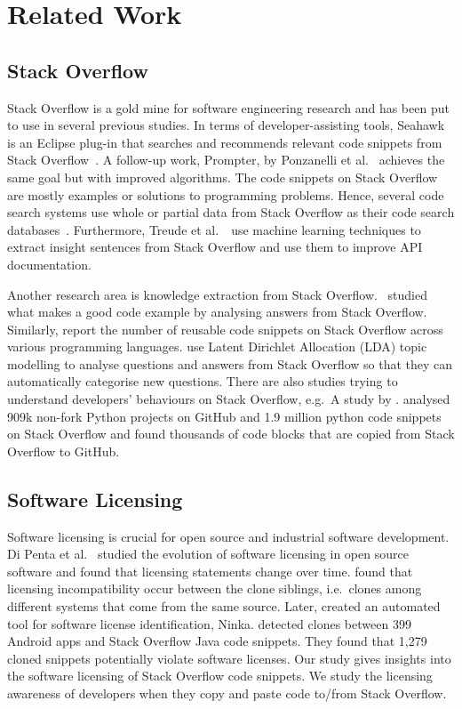 \documentclass{svjour3}                     %
\begin{document}
\section{Related Work}

\subsection{Stack Overflow}

Stack Overflow is a gold mine for software engineering research and has been put
to use in several previous studies. In terms of developer-assisting tools,
Seahawk is an Eclipse plug-in that searches and recommends relevant code
snippets from Stack Overflow~\citep{Ponzanelli2013}. A follow-up work, Prompter,
by Ponzanelli et al.~\citep{Ponzanelli2014} achieves the same goal but with
improved algorithms. The code snippets on Stack Overflow are mostly examples or
solutions to programming problems. Hence, several code search systems use whole
or partial data from Stack Overflow as their code search
databases~\citep{Keivanloo2014,Park2014,
	Stolee2014,Subramanian2013,Diamantopoulos2015}. Furthermore, Treude et
al.~\cite{Treude2016}~use machine learning techniques to extract insight
sentences from Stack Overflow and use them to improve API documentation.

Another research area is knowledge extraction from Stack Overflow.
\cite{Nasehi2012}~studied what makes a good code example by analysing answers
from Stack Overflow. Similarly, \cite{Yang2016} report the number of reusable
code snippets on Stack Overflow across various programming languages.
\cite{Wang2013_StackOverflow} use Latent Dirichlet Allocation (LDA) topic
modelling to analyse questions and answers from Stack Overflow so that they can
automatically categorise new questions. There are also studies trying to
understand developers' behaviours on Stack Overflow, e.g.~A study by
\cite{Movshovitz-Attias2013,Rosen2016,Choetkiertikul2015,Bosu2013}.
\cite{Yang2017} analysed 909k non-fork Python projects on GitHub and 1.9 million
python code snippets on Stack Overflow and found thousands of code blocks that
are copied from Stack Overflow to GitHub.

\subsection{Software Licensing} Software licensing is crucial for open source
and industrial software development. Di Penta et al.~\cite{DiPenta2010} studied
the evolution of software licensing in open source software and found that
licensing statements change over time. \cite{German2009} found that licensing
incompatibility occur between the clone siblings, i.e.~clones among different systems
that come from the same source. Later, \cite{German2010} created an automated
tool for software license identification, Ninka. \cite{An2017} detected clones
between 399 Android apps and Stack Overflow Java code snippets. They found  that
1,279 cloned snippets potentially violate software licenses. Our study gives
insights into the software licensing of Stack Overflow code snippets. We study
the licensing awareness of developers when they copy and paste code to/from
Stack Overflow.
\end{document}
